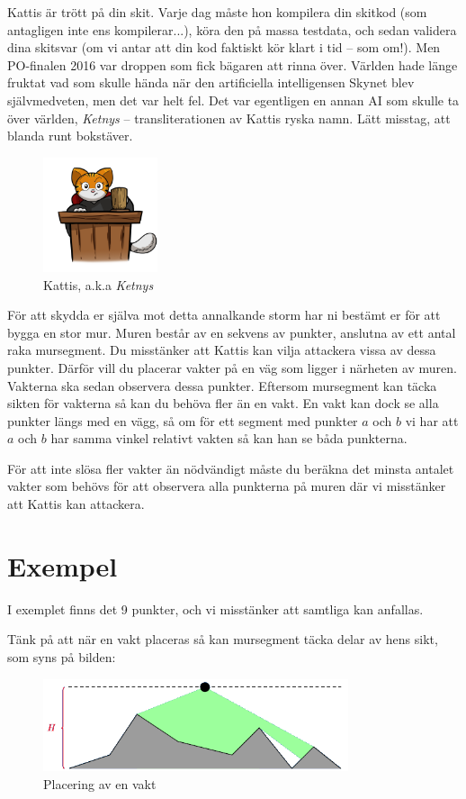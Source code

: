 \newcommand\version{v1}
Kattis är trött på din skit.
Varje dag måste hon kompilera din skitkod (som antagligen inte ens kompilerar...), köra den på massa testdata, och sedan validera dina skitsvar (om vi antar att din kod faktiskt kör klart i tid -- som om!).
Men PO-finalen 2016 var droppen som fick bägaren att rinna över.
Världen hade länge fruktat vad som skulle hända när den artificiella intelligensen Skynet blev självmedveten, men det var helt fel. Det var egentligen en annan AI som skulle ta över världen, \emph{Ketnys} -- transliterationen av Kattis ryska namn. Lätt misstag, att blanda runt bokstäver.

\begin{figure}[h!]
  \centering
  \includegraphics[width=0.3\textwidth]{kattis.png}
  \caption{Kattis, a.k.a \emph{Ketnys}}
\end{figure}

För att skydda er själva mot detta annalkande storm har ni bestämt er för att bygga en stor mur. Muren består av en sekvens av punkter, anslutna av ett antal raka mursegment.
Du misstänker att Kattis kan vilja attackera vissa av dessa punkter. Därför vill du placerar vakter på en väg som ligger i närheten av muren. Vakterna ska sedan observera dessa punkter.
Eftersom mursegment kan täcka sikten för vakterna så kan du behöva fler än en vakt. En vakt kan dock se alla punkter längs med en vägg, så om för ett segment med punkter $a$ och $b$
vi har att $a$ och $b$ har samma vinkel relativt vakten så kan han se båda punkterna.

För att inte slösa fler vakter än nödvändigt måste du beräkna det minsta antalet vakter som behövs för att observera alla punkterna på muren där vi misstänker att Kattis kan attackera.

\section*{Exempel}
I exemplet finns det 9 punkter, och vi misstänker att samtliga kan anfallas.

Tänk på att när en vakt placeras så kan mursegment täcka delar av hens sikt, som syns på bilden:
\begin{figure}[h!]
  \centering
  \includegraphics[width=0.8\textwidth]{imw.png}
  \caption{Placering av en vakt}
\end{figure}

